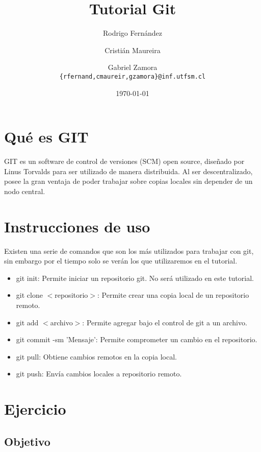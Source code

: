 \documentclass[letter, 10pt]{article}
\begin{document}
\title{Tutorial Git}
\author{Rodrigo Fernández \and Cristián Maureira \and Gabriel Zamora\\ \small{\texttt{\{rfernand,cmaureir,gzamora\}@inf.utfsm.cl}}}
\date{\today}

\maketitle

\section{Qué es GIT}

GIT es un software de control de versiones (SCM) open source, diseñado por Linus Torvalds para ser utilizado de manera distribuida. Al ser descentralizado, posee
la gran ventaja de poder trabajar sobre copias locales sin depender de un nodo central.

\section{Instrucciones de uso}

Existen una serie de comandos que son los más utilizados para trabajar con git, sin embargo por el tiempo solo se verán los que utilizaremos en el tutorial.

\begin{itemize}
	\item git init: Permite iniciar un repositorio git. No será utilizado en este tutorial.
	\item git clone $<$repositorio$>$: Permite crear una copia local de un repositorio remoto.
	\item git add $<$archivo$>$: Permite agregar bajo el control de git a un archivo.
	\item git commit -sm 'Mensaje': Permite comprometer un cambio en el repositorio.
	\item git pull: Obtiene cambios remotos en la copia local.
	\item git push: Envía cambios locales a repositorio remoto.
\end{itemize}


\section{Ejercicio}
\subsection{Objetivo}
\end{document}
